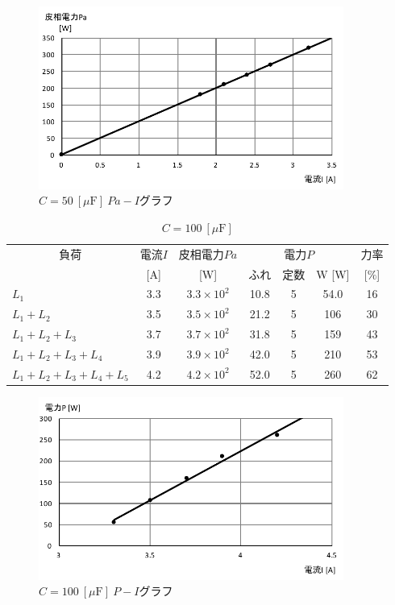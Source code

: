 \documentclass[uplatex]{jsarticle}
\begin{document}
        \begin{figure}[h]
            \centering
            \includegraphics[width = 10cm]{gurahu5.pdf}
            \caption{$C = 50 \ [\mu \mathrm F] \ Pa-I$グラフ}
        \end{figure}
        \begin{table}[h]
            \centering
            \caption{$C = 100 \ [\mu \mathrm F]$}
            \begin{tabular}{l|c|c|c|c|c|c} \hline \hline
                \multicolumn{1}{c|}{負荷}               & 電流$I$ & 皮相電力$Pa$        & \multicolumn{3}{c|}{電力$P$} & 力率 \\ \cline{4-7}
                                                        & [A]     & [W]                 & ふれ & 定数 & W [W]          & [$\%$] \\ \hline
                $L_{1}$                                 & 3.3     & $3.3 \times 10^{2}$ & 10.8 & 5 & 54.0              & 16 \\
                $L_{1} + L_{2}$                         & 3.5     & $3.5 \times 10^{2}$ & 21.2 & 5 & 106               & 30 \\
                $L_{1} + L_{2} + L_{3}$                 & 3.7     & $3.7 \times 10^{2}$ & 31.8 & 5 & 159               & 43 \\
                $L_{1} + L_{2} + L_{3}+ L_{4}$          & 3.9     & $3.9 \times 10^{2}$ & 42.0 & 5 & 210               & 53 \\
                $L_{1} + L_{2} + L_{3} + L_{4} + L_{5}$ & 4.2     & $4.2 \times 10^{2}$ & 52.0 & 5 & 260               & 62 \\ \hline
            \end{tabular}
        \end{table}
        \begin{figure}[h]
            \centering
            \includegraphics[width = 10cm]{gurahu7.pdf}
            \caption{$C = 100 \ [\mu \mathrm F] \ P-I$グラフ}
        \end{figure}
\end{document}
